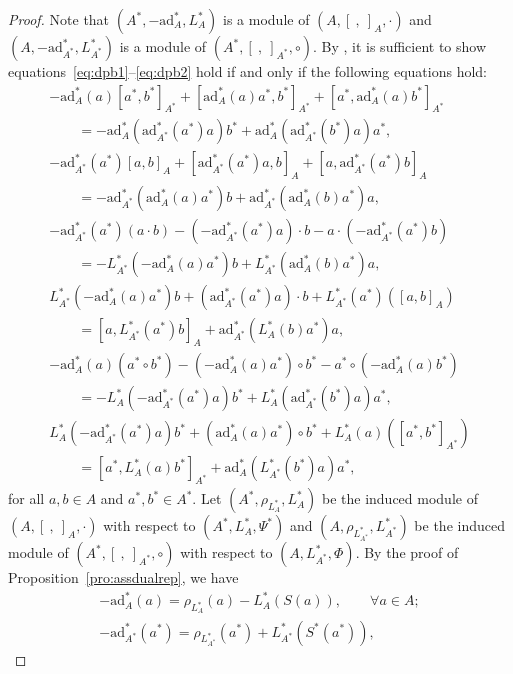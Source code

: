 \documentclass[10pt,a4paper]{amsart}
\numberwithin{equation}{section}
\newcommand{\ad}{\mathrm{ad}}
\begin{document}
\begin{proof}
	Note that $(A^*, -\ad_A^*, L_A^*)$ is a module of $(A, [\ ,\ ]_A, \cdot)$ and $(A, -\ad_{A^*}^*, L_{A^*}^*)$ is a module of $(A^*, [\ ,\ ]_{A^*}, \circ)$. By \cite[Theorem 1]{ni2013poisson}, it is sufficient to show equations~\eqref{eq:dpb1}--\eqref{eq:dpb2} hold if and only if the following equations hold:
 \begin{gather}
 -\ad_A^*(a)[a^*, b^*]_{A^*} + [\ad_A^*(a)a^*, b^*]_{A^*} + [a^*, \ad_A^*(a)b^*]_{A^*} \nonumber\\
 \qquad{}= - \ad_A^*(\ad_{A^*}^*(a^*)a) b^* + \ad_A^*(\ad_{A^*}^*(b^*)a) a^*, \label{eq:matlie1}\\
 -\ad_{A^*}^*(a^*)[a, b]_A + [\ad_{A^*}^*(a^*)a, b]_A + [a, \ad_{A^*}^*(a^*)b]_A \nonumber\\
\qquad{} = - \ad_{A^*}^*(\ad_A^*(a)a^*) b + \ad_{A^*}^*(\ad_A^*(b)a^*) a, \label{eq:matlie2} \\
 -\ad_{A^*}^*(a^*)(a \cdot b) - (-\ad_{A^*}^*(a^*) a) \cdot b - a \cdot (-\ad_{A^*}^*(a^*) b)\nonumber \\
 \qquad{} = - L_{A^*}^*(-\ad_A^*(a)a^*)b + L_{A^*}^*(\ad_A^*(b)a^*) a, \label{eq:matpoi1} \\
 L_{A^*}^*(-\ad_A^*(a)a^*)b + (\ad_{A^*}^*(a^*)a)\cdot b + L_{A^*}^*(a^*)([a, b]_A) \nonumber\\
\qquad{} = [a, L_{A^*}^*(a^*)b]_A + \ad_{A^*}^*(L_A^*(b)a^*)a, \label{eq:matpoi2} \\
 -\ad_A^*(a)(a^* \circ b^*) - (-\ad_A^*(a)a^*) \circ b^* - a^* \circ (-\ad_A^*(a)b^*) \nonumber\\
\qquad{} = - L_A^*(-\ad_{A^*}^*(a^*)a)b^* + L_A^*(\ad_{A^*}^*(b^*)a)a^*, \label{eq:matpoi3}\\
 L_A^*(-\ad_{A^*}^*(a^*)a)b^* + (\ad_A^*(a)a^*) \circ b^* + L_A^*(a)([a^*,b^*]_{A^*}) \nonumber \\
\qquad{} = [a^*, L_A^*(a)b^*]_{A^*} + \ad_A^*(L_{A^*}^*(b^*)a)a^*, \label{eq:matpoi4}
 \end{gather}
 for all $a, b \in A$ and $a^*, b^* \in A^*$. Let $(A^*,\rho_{L_A^*}, L_A^*)$ be the induced module of $(A, [\ ,\ ]_A, \cdot)$ with respect to $(A^*,L_A^*, \Psi^*)$ and $(A,\rho_{L_{A^*}^*}, L_{A^*}^*)$ be the induced module of $(A^*, [\ ,\ ]_{A^*}, \circ)$ with respect to $(A, L_{A^*}^*, \Phi)$.
 By the proof of Proposition~\ref{pro:assdualrep}, we have
 \begin{gather*}
 -\ad^*_A(a) = \rho_{L^*_A}(a) - L^*_A(S(a)),\qquad
 \forall a \in A; \\
 -\ad^*_{A^*}(a^*) = \rho_{L^*_{A^*}}(a^*) + L^*_{A^*}(S^*(a^*)), \qquad

\end{gather*}
\end{proof}
\end{document}
